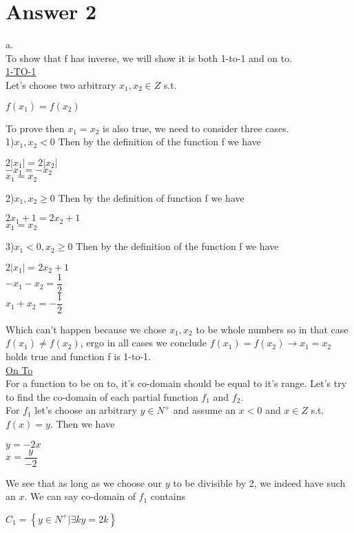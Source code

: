 \documentclass[12pt]{article}
\begin{document}
\section*{Answer 2}

a.\\
To show that f has inverse, we will show it is both 1-to-1 and on to.\\
\underline{1-TO-1}\\
Let's choose two arbitrary $x_1,x_2 \in Z$ s.t.
\begin{center}
$f(x_1)=f(x_2)$
\end{center}
To prove then $x_1=x_2$ is also true, we need to consider three cases.\\
1)$x_1,x_2<0$ 
Then by the definition of the function f we have
\begin{center}
$2|x_1|=2|x_2|$\\$-x_1=-x_2$\\$x_1=x_2$
\end{center}
2)$x_1,x_2\geq 0$ Then by the definition of function f we have
\begin{center}
$2x_1+1=2x_2+1$\\$x_1=x_2$
\end{center}
3)$x_1<0,x_2\geq 0$ Then by the definition of the function f we have
\begin{center}
$2|x_1|=2x_2+1$\\$-x_1-x_2=\dfrac{1}{2}$\\$x_1+x_2=-\dfrac{1}{2}$
\end{center}
Which can't happen because we chose $x_1,x_2$ to be whole numbers so in that case $f(x_1) \neq f(x_2)$, ergo in all cases we conclude $f(x_1)=f(x_2) \to x_1=x_2$ holds true and function f is 1-to-1.\\
\underline{On To}\\
For a function to be on to, it's co-domain should be equal to it's range. Let's try to find the co-domain of each partial function $f_1$ and $f_2$.\\
For $f_1$ let's choose an arbitrary $y\in N^+$ and assume an $x<0$ and $x\in Z$ s.t. $f(x)=y$. Then we have
\begin{center}
$y=-2x$\\$x=\dfrac{y}{-2}$
\end{center}
We see that as long as we choose our $y$ to be divisible by 2, we indeed have such an $x$. We can say co-domain of $f_1$ contains
\begin{center}
$C_1=\left\{{y\in N^+ | \exists k y=2k}\right\}$
\end{center}
\end{document}

